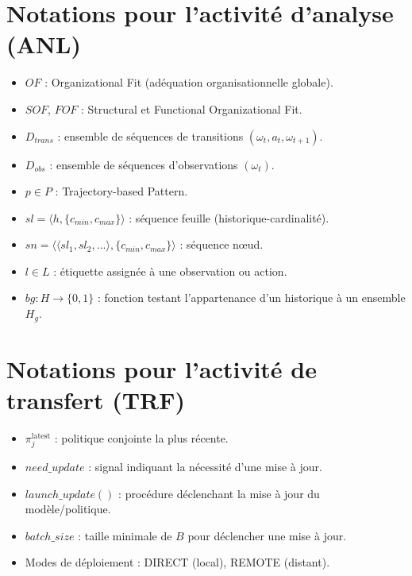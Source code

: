 \section{Notations pour l'activité d'analyse (ANL)}

\begin{itemize}
       \item $OF$ : Organizational Fit (adéquation organisationnelle globale).
       \item $SOF$, $FOF$ : Structural et Functional Organizational Fit.
       \item $D_{trans}$ : ensemble de séquences de transitions $(\omega_t, a_t, \omega_{t+1})$.
       \item $D_{obs}$ : ensemble de séquences d'observations $(\omega_t)$.
       \item $p \in P$ : Trajectory-based Pattern.
       \item $sl = \langle h, \{c_{min},c_{max}\}\rangle$ : séquence feuille (historique-cardinalité).
       \item $sn = \langle \langle sl_1, sl_2, ...\rangle, \{c_{min},c_{max}\}\rangle$ : séquence nœud.
       \item $l \in L$ : étiquette assignée à une observation ou action.
       \item $bg : H \to \{0,1\}$ : fonction testant l'appartenance d'un historique à un ensemble $H_g$.
\end{itemize}

\section{Notations pour l'activité de transfert (TRF)}

\begin{itemize}
       \item $\pi^{\text{latest}}_j$ : politique conjointe la plus récente.
       \item $need\_update$ : signal indiquant la nécessité d'une mise à jour.
       \item $launch\_update()$ : procédure déclenchant la mise à jour du modèle/politique.
       \item $batch\_size$ : taille minimale de $B$ pour déclencher une mise à jour.
       \item Modes de déploiement : DIRECT (local), REMOTE (distant).
\end{itemize}

\clearpage
\thispagestyle{empty}
\null
\newpage

